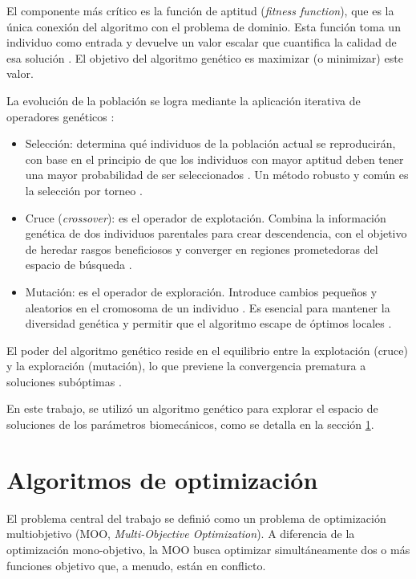 El componente más crítico es la función de aptitud (\textit{fitness function}),
que es la única conexión del algoritmo con el problema de dominio. Esta función
toma un individuo como entrada y devuelve un valor escalar que cuantifica la
calidad de esa solución \citep{goldberg1989}. El objetivo del algoritmo
genético es maximizar (o minimizar) este valor.

La evolución de la población se logra mediante la aplicación iterativa de
operadores genéticos \citep{goldberg1989}:
\begin{itemize}
      \item Selección: determina qué individuos de la población actual se reproducirán,
            con base en el principio de que los individuos con mayor aptitud deben tener
            una mayor probabilidad de ser seleccionados \citep{goldberg1989}. Un
            método robusto y común es la selección por torneo
            \citep{youtube_seleccion_individuos, wikipedia_seleccion_torneos}.
      \item Cruce (\textit{crossover}): es el operador de explotación. Combina la
            información genética de dos individuos parentales para crear descendencia, con
            el objetivo de heredar rasgos beneficiosos y converger en regiones prometedoras
            del espacio de búsqueda \citep{goldberg1989}.
      \item Mutación: es el operador de exploración. Introduce cambios pequeños y
            aleatorios en el cromosoma de un individuo \citep{goldberg1989}. Es
            esencial para mantener la diversidad genética y permitir que el algoritmo
            escape de óptimos locales \citep{goldberg1989}.
\end{itemize}
El poder del algoritmo genético reside en el equilibrio entre la explotación (cruce) y la exploración (mutación), lo que previene la convergencia prematura a soluciones subóptimas \citep{goldberg1989}.

En este trabajo, se utilizó un algoritmo genético para explorar el espacio de
soluciones de los parámetros biomecánicos, como se detalla en la sección
\ref{sec:optimizacion}.
\section{Algoritmos de optimización}
\label{sec:optimizacion}

El problema central del trabajo se definió como un problema de optimización
multiobjetivo (MOO, \textit{Multi-Objective Optimization}). A diferencia de la
optimización mono-objetivo, la MOO busca optimizar simultáneamente dos o más
funciones objetivo que, a menudo, están en conflicto.

